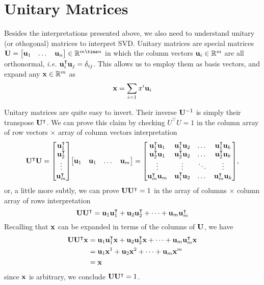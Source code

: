 \documentclass{article}
\begin{document}
\section{Unitary Matrices}
Besides the interpretations presented above, we also need to understand unitary (or othogonal) matrices to interpret SVD. Unitary matrices are special matrices $\vb{U}=\mqty[\vb{u}_1 & \dots & \vb{u}_n]\in\mathbb{R}^{m\tims n}$ in which the column vectors $\vb{u}_i\in\mathbb{R}^m$ are all orthonormal, \textit{i.e.} $\vb{u}_i^\intercal \vb{u}_j = \delta_{ij}$. This allows us to employ them as basis vectors, and expand any $\vb{x}\in\mathbb{R}^m$ as $$\vb{x}= \sum_{i=1} x^i \vb{u}_i$$ 

Unitary matrices are quite easy to invert. Their inverse $\vb{U}^{-1}$ is simply their transpose $\vb{U}^{\intercal}$. We can prove this claim by checking $U^\intercal U = 1$ in the column array of row vectors $\times$ array of column vectors interpretation
\begin{equation}
    \vb{U}^{\intercal}\vb{U} = \mqty[\vb{u}_1^\intercal \\ \vb{u}_2^\intercal \\ \vdots \\\vb{u}_m^\intercal]\mqty[\vb{u}_1 & \vb{u}_1 & \dots & \vb{u}_m] =     
        \mqty[\vb{u}_1^\intercal\vb{u}_1 & \vb{u}_1^\intercal\vb{u}_2 & \dots & \vb{u}_1^\intercal\vb{u}_k\\
        \vb{u}_2^\intercal\vb{u}_1 & \vb{u}_2^\intercal\vb{u}_2 & \dots & \vb{u}_2^\intercal\vb{u}_k\\
        \vdots & \vdots & \ddots & \vdots\\
        \vb{u}_m^\intercal\vb{u}_m & \vb{u}_1^\intercal\vb{u}_2 & \dots & \vb{u}_m^\intercal\vb{u}_k],
\end{equation}
or, a little more subtly, we can prove $\vb{U}\vb{U}^\intercal=1$ in the array of columns $\times$ column array of rows interpretation
\begin{equation}
    \vb{U}\vb{U}^\intercal = \vb{u}_1\vb{u}_1^\intercal + \vb{u}_2\vb{u}_2^\intercal + \dots + \vb{u}_m\vb{u}_m^\intercal
\end{equation}
Recalling that $\vb{x}$ can be expanded in terms of the columns of $\vb{U}$, we have
\begin{equation}
    \begin{aligned}
    \vb{U}\vb{U}^\intercal \vb{x} &= \vb{u}_1\vb{u}_1^\intercal\vb{x} + \vb{u}_2\vb{u}_2^\intercal\vb{x} + \dots + \vb{u}_m\vb{u}_m^\intercal\vb{x}\\
       & = \vb{u}_1\vb{x}^1 + \vb{u}_2\vb{x}^2 + \dots + \vb{u}_m\vb{x}^m\\
       & = \vb{x}
    \end{aligned}
 \end{equation}
 since $\vb{x}$ is arbitrary, we conclude $\vb{U}\vb{U}^\intercal=1$. 
\end{document}
